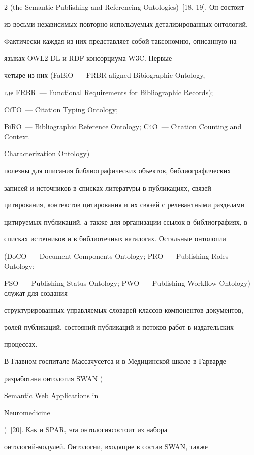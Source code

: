 \begin{multicols}{2}
({the Semantic Publishing and Referencing Ontologies})~[18, 19]. Он состоит 


из восьми независимых повторно используемых детализированных онтологий. 


Фактически каждая из них представляет собой таксономию, описанную на 


языках {OWL2 DL} и {RDF} консорциума {W3C}. Первые 


четыре из них (FaBiO~--- FRBR-aligned Bibiographic Ontology,


где FRBR~--- Functional Requirements for Bibliographic Records);


CiTO~--- Citation Typing Ontology;


BiRO~--- Bibliographic Reference Ontology;  C4O~--- Citation Counting and Context


Characterization Ontology) 


полезны для описания библиографических объектов, библиографических 


записей и источников в списках литературы в пуб\-ли\-ка\-ци\-ях, связей 


цитирования, контекстов цитирования и их связей с релевантными разделами 


цитируемых пуб\-ли\-ка\-ций, а также для организации ссылок в библиографиях, в 


списках источников и в биб\-лио\-теч\-ных каталогах. Остальные онтологии 


(DoCO~--- Document Components Ontology; PRO~--- Publishing Roles Ontology;


PSO~--- Publishing Status Ontology; PWO~--- Publishing Workflow Ontology) служат для создания 


структурированных управляемых словарей классов компонентов документов, 


ролей пуб\-ли\-ка\-ций, со\-сто\-яний пуб\-ли\-ка\-ций и потоков работ в издательских 


процессах.


  


  В Главном госпитале Массачусетса и в Медицинской школе в Гарварде 


разработана онтология {SWAN} ({Semantic Web Applications in 


Neuromedicine})~[20]. Как и {SPAR}, эта онтология\linebreak состоит из набора 


он\-то\-ло\-гий-мо\-ду\-лей. Онтологии, входящие в состав {SWAN}, также 



\end{multicols}
